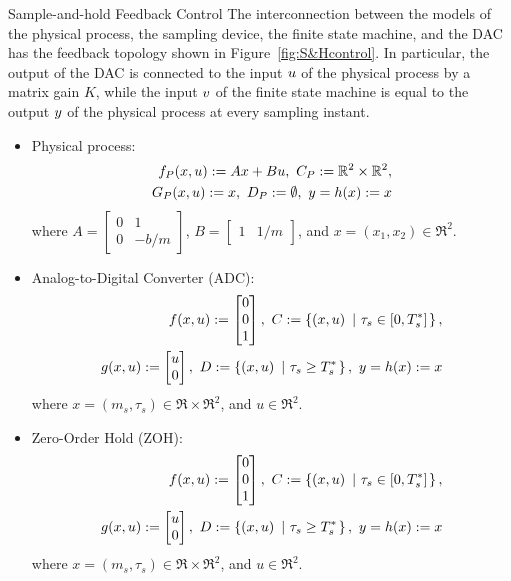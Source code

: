 \begin{example}{Sample-and-hold Feedback Control}
The interconnection between the models of the physical process, the sampling device, the finite state 
machine, and the DAC has the feedback topology shown in Figure~\ref{fig:S&Hcontrol}.  In particular, the output of the DAC is connected to the input $u$ of the physical process by a matrix gain $K$, while the input $v$ of the finite state machine is equal to the output $y$ of the physical process
at every sampling instant. 
\begin{itemize}
\item Physical process:
\begin{eqnarray}
\fp(\xp, u):= A\xp + Bu,\ 
   \Cp : = \Re^{2}\times\Re^{2},\\
\gp(\xp, u):= \xp,\ 
    \Dp: =\emptyset,\ 
\yp = h(\xp) : =x
\end{eqnarray}
where $A = \begin{bmatrix}0 & 1 \\ 0 & -b/m\end{bmatrix}$, $B = \begin{bmatrix}1 & 1/m\end{bmatrix}$, and $x=(x_1,x_2)\in\Re^{2}$.

\item Analog-to-Digital Converter (ADC):
\begin{eqnarray}
f(x, u):= \begin{bmatrix}0\\0\\1\end{bmatrix},\ 
   C : = \defset{(x,u)}{ \tau_s \in [0,T^*_s] },\\
g(x, u):= \begin{bmatrix} u\\ 0\end{bmatrix},\ 
    D: =\defset{(x,u)}{ \tau_s \geq T^*_s },\ 
y = h(x) : =x
\end{eqnarray}
where $x=(m_s,\tau_s)\in\Re\times\Re^{2}$, and $u\in\Re^{2}$.

\item Zero-Order Hold (ZOH):
\begin{eqnarray}
f(x, u):= \begin{bmatrix}0\\0\\1\end{bmatrix},\ 
   C : = \defset{(x,u)}{ \tau_s \in [0,T^*_s] },\\
g(x, u):= \begin{bmatrix} u\\ 0\end{bmatrix},\ 
    D: =\defset{(x,u)}{ \tau_s \geq T^*_s },\ 
y = h(x) : =x
\end{eqnarray}
where $x=(m_s,\tau_s)\in\Re\times\Re^{2}$, and $u\in\Re^{2}$.


\end{itemize}
\end{example}
